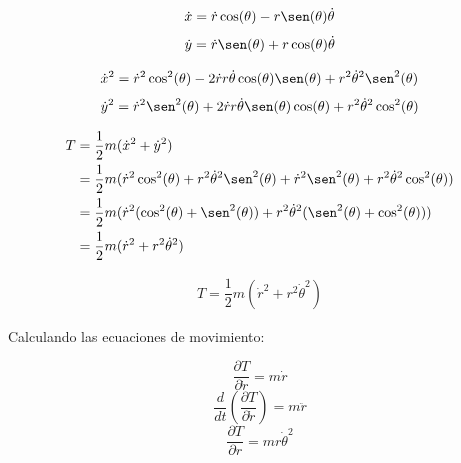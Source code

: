 \documentclass[letter,11pt]{article}
\begin{document}
\begin{equation*}
    \dot{x}=\dot{r}\cos(\theta)-r\sen(\theta)\dot{\theta}
\end{equation*}
\begin{equation*}
    \dot{y}=\dot{r}\sen(\theta)+r\cos(\theta)\dot{\theta}
\end{equation*}

\begin{equation*}
    \dot{x}^2=\dot{r}^2\cos^2(\theta)
             -2\dot{r}r\dot{\theta}\cos(\theta)\sen(\theta)
             +r^2\dot{\theta}^2\sen^2(\theta)
\end{equation*}
\begin{equation*}
    \dot{y}^2=\dot{r}^2\sen^2(\theta)
             +2\dot{r}r\dot{\theta}\sen(\theta)\cos(\theta)
             +r^2\dot{\theta}^2\cos^2(\theta)
\end{equation*}

\begin{equation*}
\begin{split}
    T&=\frac{1}{2}m(\dot{x}^2+\dot{y}^2)\\
     &=\frac{1}{2}m(
           \dot{r}^2\cos^2(\theta)+
           r^2\dot{\theta}^2\sen^2(\theta)+
           \dot{r}^2\sen^2(\theta)+
           r^2\dot{\theta}^2\cos^2(\theta)
       )\\
     &=\frac{1}{2}m(
           \dot{r}^2(
               \cos^2(\theta)+\sen^2(\theta)
           )+
           r^2\dot{\theta}^2(
               \sen^2(\theta)+\cos^2(\theta)
           )
       )\\
     &=\frac{1}{2}m(\dot{r}^2+r^2\dot{\theta}^2)
\end{split}
\end{equation*}

\begin{equation}
\boxed{\begin{array}{l}
    T=\dfrac{1}{2}m(\dot{r}^2+r^2\dot{\theta}^2)
\end{array}}
\label{ec01}
\end{equation}

Calculando las ecuaciones de movimiento:

\begin{equation*}
    \frac{\partial T}{\partial \dot{r}}=m\dot{r}
\end{equation*}
\begin{equation*}
    \frac{d}{dt}\left(\frac{\partial T}{\partial \dot{r}}\right)=m\ddot{r}
\end{equation*}
\begin{equation*}
    \frac{\partial T}{\partial r}=mr\dot{\theta}^2
\end{equation*}
\end{document}
